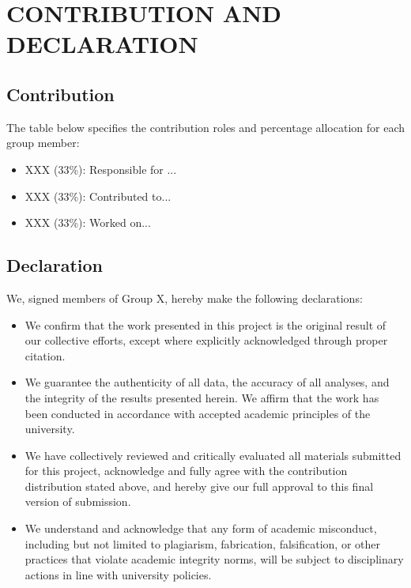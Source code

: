 \section*{CONTRIBUTION AND DECLARATION}

\subsection*{Contribution}


The table below specifies the contribution roles and percentage allocation for each group member:

\begin{itemize}
    \item XXX (33\%): Responsible for ...
    \item XXX (33\%): Contributed to...
    \item XXX (33\%): Worked on...
\end{itemize}

\subsection*{Declaration}



We, signed members of Group X, hereby make the following declarations:

\begin{itemize}


\item We confirm that the work presented in this project is the original result of our collective efforts, except where explicitly acknowledged through proper citation.

\item We guarantee the authenticity of all data, the accuracy of all analyses, and the integrity of the results presented herein. We affirm that the work has been conducted in accordance with accepted academic principles of the university.

\item We have collectively reviewed and critically evaluated all materials submitted for this project, acknowledge and fully agree with the contribution distribution stated above, and hereby give our full approval to this final version of submission.

\item We understand and acknowledge that any form of academic misconduct, including but not limited to plagiarism, fabrication, falsification, or other practices that violate academic integrity norms, will be subject to disciplinary actions in line with university policies.

\end{itemize}

